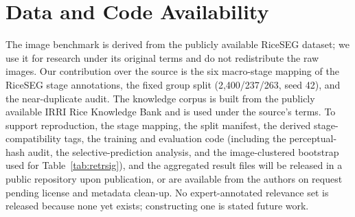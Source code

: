 \documentclass{llncs}
\begin{document}
\section{Data and Code Availability}
\label{sec:availability}

The image benchmark is derived from the publicly available RiceSEG dataset; we use it for research under its original terms and do not redistribute the raw images. Our contribution over the source is the six macro-stage mapping of the RiceSEG stage annotations, the fixed group split (2{,}400/237/263, seed 42), and the near-duplicate audit. The knowledge corpus is built from the publicly available IRRI Rice Knowledge Bank and is used under the source's terms. To support reproduction, the stage mapping, the split manifest, the derived stage-compatibility tags, the training and evaluation code (including the perceptual-hash audit, the selective-prediction analysis, and the image-clustered bootstrap used for Table~\ref{tab:retrsig}), and the aggregated result files will be released in a public repository upon publication, or are available from the authors on request pending license and metadata clean-up. No expert-annotated relevance set is released because none yet exists; constructing one is stated future work.



\end{document}
